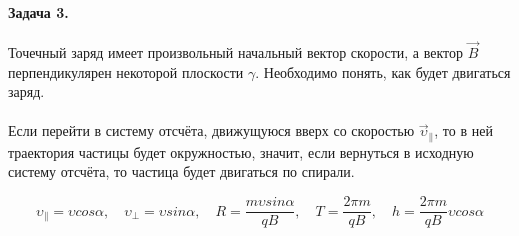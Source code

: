 \documentclass[dvipdfmx]{article}
\begin{document}
\paragraph{Задача 3.}

Точечный заряд имеет произвольный начальный вектор скорости, а вектор $\vec{B}$ перпендикулярен
некоторой плоскости $\gamma$.
Необходимо понять, как будет двигаться заряд.

\noindent{}
\paragraph{}

Если перейти в систему отсчёта, движущуюся вверх со скоростью $\vec{\upsilon}_\parallel$, то в ней траектория частицы
будет окружностью, значит, если вернуться в исходную систему отсчёта, то частица будет двигаться по спирали.

\begin{equation*}
  \upsilon_\parallel = \upsilon cos\alpha, \quad \upsilon_\perp = \upsilon sin\alpha,
  \quad R = \frac{m\upsilon sin\alpha}{qB}, \quad T = \frac{2\pi m}{qB}, \quad h = \frac{2\pi m}{qB} \upsilon cos\alpha
\end{equation*}
\end{document}
